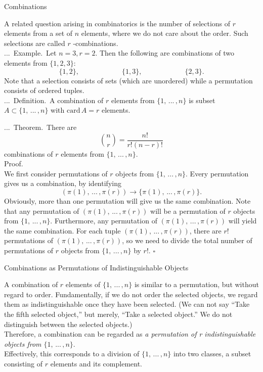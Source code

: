 \documentclass[smaller,hyperref={CJKbookmarks=true}]{beamer}
\newenvironment{PROOF}{{\noindent\!\sf\alert{Proof.}}\\}{\hfill$\square$\\}
\newcounter{zhuo}[subsection]
\renewcommand{\thezhuo}{\thesection.\thesubsection.\arabic{zhuo}}
\newenvironment{DEFINITION}{\stepcounter{zhuo}\alert{\thezhuo.~Definition.\,}}{}
\newenvironment{EXAMPLE}{\stepcounter{zhuo}\alert{\!\thezhuo.~Example.\,}}{}
\newenvironment{THEOREM}{\stepcounter{zhuo}\alert{\thezhuo.~Theorem.\,}}{}
\begin{document}
\begin{frame}{Combinations}
\begin{spacing}{1.1}
A related question arising in combinatorics is the number of selections of $r$
elements from a set of $n$ elements, where we do not care about the order.
Such selections are called $r$ -combinations.\\[5pt]
\begin{EXAMPLE}
Let $n=3,r=2$. Then the following are combinations of two elements from $\{1,2,3\}$:
\[\{1,2\},\qquad\qquad\qquad\{1,3\},\qquad
\qquad\qquad\{2,3\}.\]
Note that a selection consists of sets (which are unordered) while a
permutation consists of ordered tuples.\\[5pt]
\begin{DEFINITION}
A combination of $r$ elements from $\{1,\,...\,,n\}$ is subset $A\subset\{1,\,...\,,n\}$ with $\text{card}\,A=r$ elements.
\end{DEFINITION}
\end{EXAMPLE}
\end{spacing}
\newpage
\begin{spacing}{0.9}
\begin{THEOREM}
There are
\[\binom{n}{r}=\frac{n!}{r!(n-r)!}\]
combinations of $r$ elements from $\{1,\,...\,,n\}$.\\[5pt]
\end{THEOREM}
\begin{PROOF}
We first consider permutations of $r$ objects from $\{1,\,...\,,n\}$. Every permutation gives us a combination, by identifying
\[(\pi(1),\,...\,,\pi(r))\longrightarrow\{\pi(1),\,...\,,\pi(r)\}.\]
Obviously, more than one permutation will give us the same combination.
Note that any permutation of $(\pi(1),\,...\,,\pi(r))$ will be a permutation of $r$ objects from $\{1,\,...\,,n\}$. Furthermore, any permutation of $(\pi(1),\,...\,,\pi(r))$ will yield the same combination. For each tuple $(\pi(1),\,...\,,\pi(r))$, there are $r!$ permutations of $(\pi(1),\,...\,,\pi(r))$, so we need to divide the total number of permutations of $r$ objects from $\{1,\,...\,,n\}$ by $r!$.
\end{PROOF}
\end{spacing}
\end{frame}
\begin{frame}[c]{Combinations as Permutations of Indistinguishable Objects}
\begin{spacing}{1.2}
A combination of $r$ elements of $\{1,\,...\,,n\}$ is similar to a permutation, but
without regard to order. Fundamentally, if we do not order the selected
objects, we regard them as indistinguishable once they have been selected.
(We can not say ``Take the fifth selected object,'' but merely, ``Take a
selected object.'' We do not distinguish between the selected objects.)\\[6pt]
Therefore, a combination can be regarded as \emph{a permutation of r indistinguishable objects from $\{1,\,...\,,n\}$}.\\[5pt]
Effectively, this corresponds to a division of $\{1,\,...\,,n\}$ into two classes, a subset consisting of $r$ elements and its complement.
\end{spacing}
\end{frame}
\end{document}

